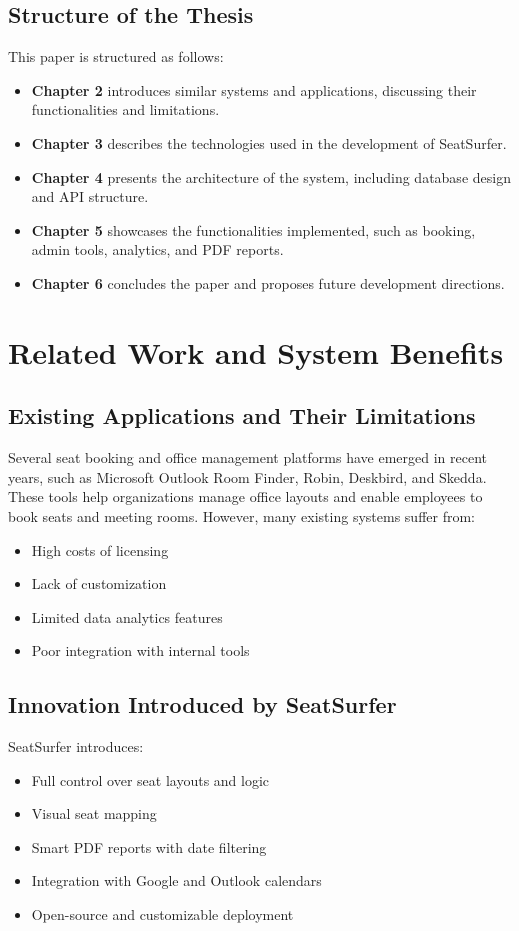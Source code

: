 \documentclass[12pt,a4paper]{report}
\begin{document}
\section{Structure of the Thesis}
This paper is structured as follows:
\begin{itemize}
    \item \textbf{Chapter 2} introduces similar systems and applications, discussing their functionalities and limitations.
    \item \textbf{Chapter 3} describes the technologies used in the development of SeatSurfer.
    \item \textbf{Chapter 4} presents the architecture of the system, including database design and API structure.
    \item \textbf{Chapter 5} showcases the functionalities implemented, such as booking, admin tools, analytics, and PDF reports.
    \item \textbf{Chapter 6} concludes the paper and proposes future development directions.
\end{itemize}

\chapter{Related Work and System Benefits}

\section{Existing Applications and Their Limitations}
Several seat booking and office management platforms have emerged in recent years, such as Microsoft Outlook Room Finder, Robin, Deskbird, and Skedda. These tools help organizations manage office layouts and enable employees to book seats and meeting rooms. However, many existing systems suffer from:
\begin{itemize}
    \item High costs of licensing
    \item Lack of customization
    \item Limited data analytics features
    \item Poor integration with internal tools
\end{itemize}

\section{Innovation Introduced by SeatSurfer}
SeatSurfer introduces:
\begin{itemize}
    \item Full control over seat layouts and logic
    \item Visual seat mapping
    \item Smart PDF reports with date filtering
    \item Integration with Google and Outlook calendars
    \item Open-source and customizable deployment
\end{itemize}
\end{document}
